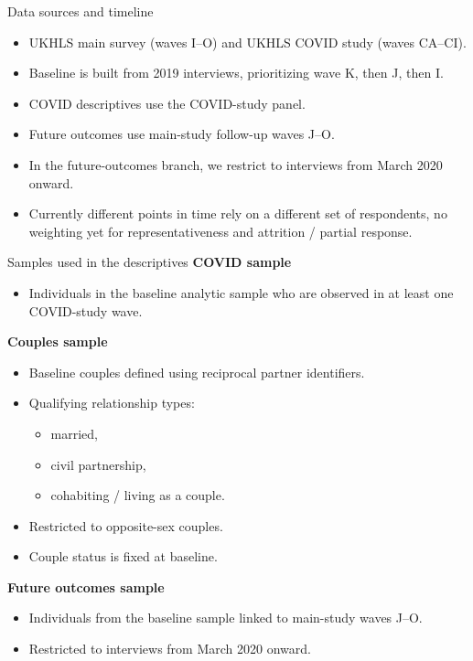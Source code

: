 \documentclass[aspectratio=169,11pt]{beamer}
\begin{document}
\begin{frame}{Data sources and timeline}
\begin{itemize}
  \item UKHLS main survey (waves I--O) and UKHLS COVID study (waves CA--CI).
  \item Baseline is built from 2019 interviews, prioritizing wave K, then J, then I.
  \item COVID descriptives use the COVID-study panel.
  \item Future outcomes use main-study follow-up waves J--O.
  \item In the future-outcomes branch, we restrict to interviews from March 2020 onward.
  \item Currently different points in time rely on a different set of respondents, no weighting yet for representativeness and attrition / partial response.
\end{itemize}
\end{frame}

\begin{frame}{Samples used in the descriptives}
\textbf{COVID sample}
\begin{itemize}
  \item Individuals in the baseline analytic sample who are observed in at least one COVID-study wave.
\end{itemize}

\vspace{0.4em}

\textbf{Couples sample}
\begin{itemize}
  \item Baseline couples defined using reciprocal partner identifiers.
  \item Qualifying relationship types:
    \begin{itemize}
      \item married,
      \item civil partnership,
      \item cohabiting / living as a couple.
    \end{itemize}
  \item Restricted to opposite-sex couples.
  \item Couple status is fixed at baseline.
\end{itemize}

\vspace{0.4em}

\textbf{Future outcomes sample}
\begin{itemize}
  \item Individuals from the baseline sample linked to main-study waves J--O.
  \item Restricted to interviews from March 2020 onward.
\end{itemize}
\end{frame}
\end{document}
